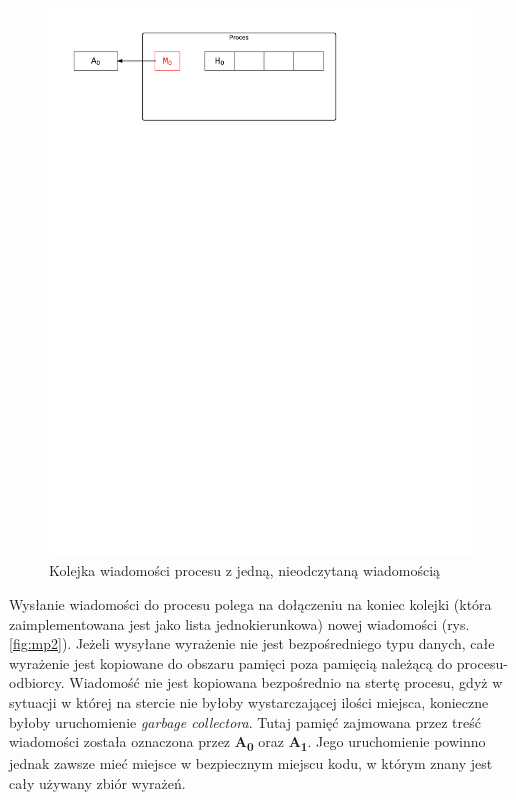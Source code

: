 \begin{figure}[h]
\centerline{\includegraphics[scale=0.75, clip, trim=10mm 220mm 68mm 10mm]{mp1}}
\caption{Kolejka wiadomości procesu z jedną, nieodczytaną wiadomością}
\label{fig:mp1}
\end{figure}

Wysłanie wiadomości do procesu polega na dołączeniu na koniec kolejki (która zaimplementowana jest jako lista jednokierunkowa) nowej wiadomości (rys. \ref{fig:mp2}).
Jeżeli wysyłane wyrażenie nie jest bezpośredniego typu danych, całe wyrażenie jest kopiowane do obszaru pamięci poza pamięcią należącą do procesu-odbiorcy.
Wiadomość nie jest kopiowana bezpośrednio na stertę procesu, gdyż w sytuacji w której na stercie nie byłoby wystarczającej ilości miejsca, konieczne byłoby uruchomienie \emph{garbage collectora}.
Tutaj pamięć zajmowana przez treść wiadomości została oznaczona przez \textbf{A\textsubscript{0}} oraz \textbf{A\textsubscript{1}}.
Jego uruchomienie powinno jednak zawsze mieć miejsce w bezpiecznym miejscu kodu, w którym znany jest cały używany zbiór wyrażeń.


